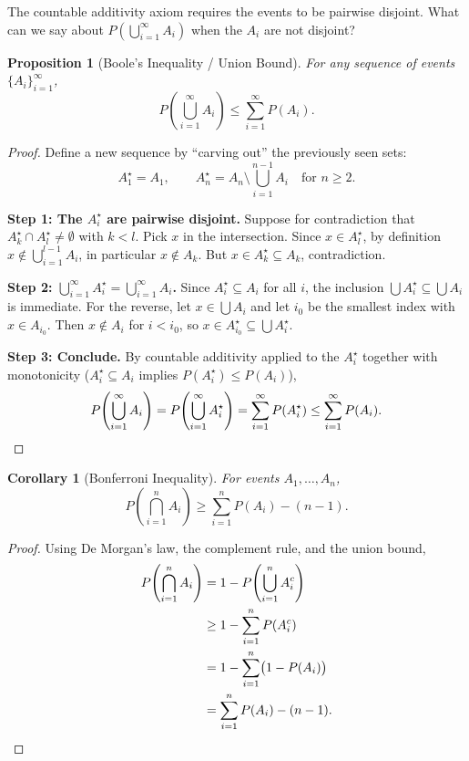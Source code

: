 \documentclass{article}
\newtheorem{corollary}{Corollary}[theorem]
\newtheorem{proposition}{Proposition}
\begin{document}
The countable additivity axiom requires the events to be pairwise disjoint. What can we say about $P(\bigcup_{i=1}^\infty A_i)$ when the $A_i$ are not disjoint?

\begin{proposition}[Boole's Inequality / Union Bound]
For any sequence of events $\{A_i\}_{i=1}^\infty$,
\[
P\!\left(\bigcup_{i=1}^\infty A_i\right) \leq \sum_{i=1}^\infty P(A_i).
\]
\end{proposition}

\begin{proof}
Define a new sequence by ``carving out'' the previously seen sets:
\[
A_1^\star = A_1, \qquad A_n^\star = A_n \setminus \bigcup_{i=1}^{n-1} A_i \quad \text{for } n \geq 2.
\]

\textbf{Step 1: The $A_i^\star$ are pairwise disjoint.} Suppose for contradiction that $A_k^\star \cap A_l^\star \neq \emptyset$ with $k < l$. Pick $x$ in the intersection. Since $x \in A_l^\star$, by definition $x \notin \bigcup_{i=1}^{l-1} A_i$, in particular $x \notin A_k$. But $x \in A_k^\star \subseteq A_k$, contradiction.

\textbf{Step 2: $\bigcup_{i=1}^\infty A_i^\star = \bigcup_{i=1}^\infty A_i$.} Since $A_i^\star \subseteq A_i$ for all $i$, the inclusion $\bigcup A_i^\star \subseteq \bigcup A_i$ is immediate. For the reverse, let $x \in \bigcup A_i$ and let $i_0$ be the smallest index with $x \in A_{i_0}$. Then $x \notin A_i$ for $i < i_0$, so $x \in A_{i_0}^\star \subseteq \bigcup A_i^\star$.

\textbf{Step 3: Conclude.} By countable additivity applied to the $A_i^\star$ together with monotonicity ($A_i^\star \subseteq A_i$ implies $P(A_i^\star) \leq P(A_i)$),
\[
P\!\left(\bigcup_{i=1}^\infty A_i\right) = P\!\left(\bigcup_{i=1}^\infty A_i^\star\right) = \sum_{i=1}^\infty P(A_i^\star) \leq \sum_{i=1}^\infty P(A_i). \qedhere
\]
\end{proof}

\begin{corollary}[Bonferroni Inequality]
For events $A_1, \ldots, A_n$,
\[
P\!\left(\bigcap_{i=1}^n A_i\right) \geq \sum_{i=1}^n P(A_i) - (n-1).
\]
\end{corollary}

\begin{proof}
Using De Morgan's law, the complement rule, and the union bound,
\begin{align*}
P\!\left(\bigcap_{i=1}^n A_i\right) &= 1 - P\!\left(\bigcup_{i=1}^n A_i^c\right)\\
&\geq 1 - \sum_{i=1}^n P(A_i^c)\\
&= 1 - \sum_{i=1}^n \bigl(1 - P(A_i)\bigr)\\
&= \sum_{i=1}^n P(A_i) - (n-1). \qedhere
\end{align*}
\end{proof}
\end{document}
